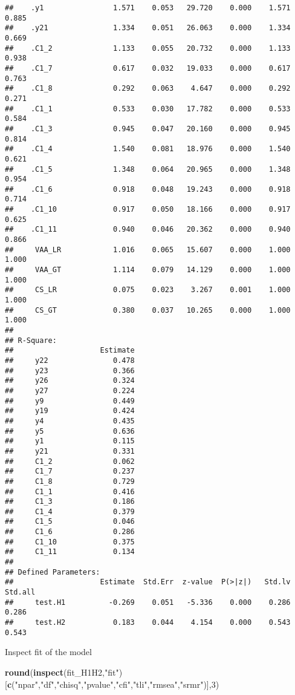 \documentclass[
]{article}
\newenvironment{Shaded}{\begin{snugshade}}{\end{snugshade}}
\newcommand{\DecValTok}[1]{\textcolor[rgb]{0.00,0.00,0.81}{#1}}
\newcommand{\KeywordTok}[1]{\textcolor[rgb]{0.13,0.29,0.53}{\textbf{#1}}}
\newcommand{\NormalTok}[1]{#1}
\newcommand{\StringTok}[1]{\textcolor[rgb]{0.31,0.60,0.02}{#1}}
\begin{document}
\begin{verbatim}
##    .y1                1.571    0.053   29.720    0.000    1.571    0.885
##    .y21               1.334    0.051   26.063    0.000    1.334    0.669
##    .C1_2              1.133    0.055   20.732    0.000    1.133    0.938
##    .C1_7              0.617    0.032   19.033    0.000    0.617    0.763
##    .C1_8              0.292    0.063    4.647    0.000    0.292    0.271
##    .C1_1              0.533    0.030   17.782    0.000    0.533    0.584
##    .C1_3              0.945    0.047   20.160    0.000    0.945    0.814
##    .C1_4              1.540    0.081   18.976    0.000    1.540    0.621
##    .C1_5              1.348    0.064   20.965    0.000    1.348    0.954
##    .C1_6              0.918    0.048   19.243    0.000    0.918    0.714
##    .C1_10             0.917    0.050   18.166    0.000    0.917    0.625
##    .C1_11             0.940    0.046   20.362    0.000    0.940    0.866
##     VAA_LR            1.016    0.065   15.607    0.000    1.000    1.000
##     VAA_GT            1.114    0.079   14.129    0.000    1.000    1.000
##     CS_LR             0.075    0.023    3.267    0.001    1.000    1.000
##     CS_GT             0.380    0.037   10.265    0.000    1.000    1.000
## 
## R-Square:
##                    Estimate
##     y22               0.478
##     y23               0.366
##     y26               0.324
##     y27               0.224
##     y9                0.449
##     y19               0.424
##     y4                0.435
##     y5                0.636
##     y1                0.115
##     y21               0.331
##     C1_2              0.062
##     C1_7              0.237
##     C1_8              0.729
##     C1_1              0.416
##     C1_3              0.186
##     C1_4              0.379
##     C1_5              0.046
##     C1_6              0.286
##     C1_10             0.375
##     C1_11             0.134
## 
## Defined Parameters:
##                    Estimate  Std.Err  z-value  P(>|z|)   Std.lv  Std.all
##     test.H1          -0.269    0.051   -5.336    0.000    0.286    0.286
##     test.H2           0.183    0.044    4.154    0.000    0.543    0.543
\end{verbatim}

Inspect fit of the model

\begin{Shaded}
\begin{Highlighting}[]
\KeywordTok{round}\NormalTok{(}\KeywordTok{inspect}\NormalTok{(fit_H1H2,}\StringTok{"fit"}\NormalTok{)}
\NormalTok{      [}\KeywordTok{c}\NormalTok{(}\StringTok{"npar"}\NormalTok{,}\StringTok{"df"}\NormalTok{,}\StringTok{"chisq"}\NormalTok{,}\StringTok{"pvalue"}\NormalTok{,}\StringTok{"cfi"}\NormalTok{,}\StringTok{"tli"}\NormalTok{,}\StringTok{"rmsea"}\NormalTok{,}\StringTok{"srmr"}\NormalTok{)],}\DecValTok{3}\NormalTok{)}
\end{Highlighting}
\end{Shaded}
\end{document}
